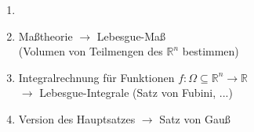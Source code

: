 \documentclass[11pt,a4paper,fleqn,openany]{report}
\begin{document}
  \begin{goals}
    \begin{enumerate}
      \item[]
      \item Maßtheorie $\to$ Lebesgue-Maß\\(Volumen von Teilmengen des $\mathbb{R}^n$ bestimmen)
      \item Integralrechnung für Funktionen $f:\Omega \subseteq \mathbb{R}^n \to \mathbb{R}$\\$\to$ Lebesgue-Integrale (Satz von Fubini, ...)
      \item Version des Hauptsatzes $\to$ Satz von Gauß 
    \end{enumerate}
  \end{goals}

  
  
  
  
  
  
  
  
\end{document}
